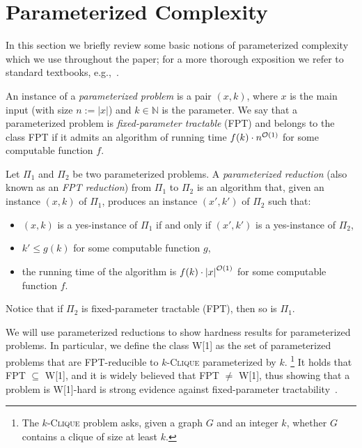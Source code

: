 \section{Parameterized Complexity}\label{parameterized_complexity}

In this section we briefly review some basic notions of parameterized complexity
which we use throughout the paper;
for a more thorough exposition we refer to standard textbooks, e.g.,~\cite{books/CyganFKLMPPS15,books/DowneyF13}.


An instance of a \emph{parameterized problem} is a pair
$(x,k)$, where $x$ is the main input (with size $n := |x|$) and
$k \in \mathbb{N}$ is the parameter.
We say that a parameterized problem is \emph{fixed-parameter tractable} (FPT)
and belongs to the class FPT if it admits an algorithm of running time
$f(k) \cdot n^{\mathcal{O}(1)}$ for some computable function $f$.

Let $\Pi_1$ and $\Pi_2$ be two parameterized problems.
A \emph{parameterized reduction} (also known as an \emph{FPT reduction}) from $\Pi_1$ to $\Pi_2$ is an algorithm that, given an instance $(x,k)$ of $\Pi_1$,
produces an instance $(x',k')$ of $\Pi_2$ such that:
\begin{itemize}
    \item $(x,k)$ is a yes-instance of $\Pi_1$ if and only if $(x',k')$ is a yes-instance of $\Pi_2$,
    \item $k' \leq g(k)$ for some computable function $g$,
    \item the running time of the algorithm is $f(k) \cdot {|x|}^{\mathcal{O}(1)}$ for some computable function $f$.
\end{itemize}
Notice that if $\Pi_2$ is fixed-parameter tractable (FPT), then so is $\Pi_1$.

We will use parameterized reductions to show hardness results for parameterized problems.
In particular, we define the class W[1] as the set of parameterized problems that are
FPT-reducible to \textsc{$k$-Clique} parameterized by $k$.%
\footnote{The \textsc{$k$-Clique} problem asks,
given a graph $G$ and an integer $k$, whether $G$ contains a clique of size at least $k$.}
It holds that FPT $\subseteq$ W[1], and it is widely believed that FPT $\neq$ W[1],
thus showing that a problem is W[1]-hard is strong evidence against fixed-parameter tractability~\cite{books/CyganFKLMPPS15,books/DowneyF13}.

